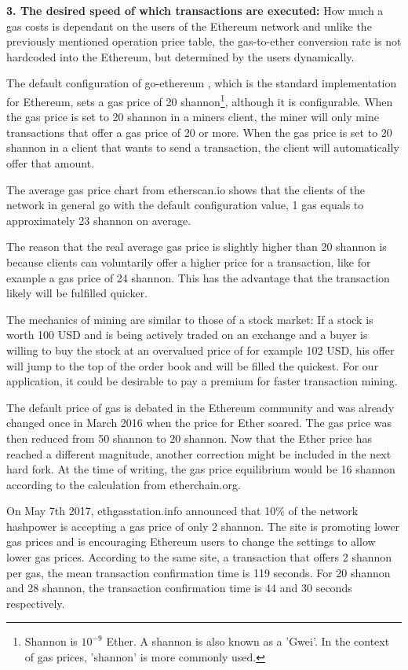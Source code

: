 \par
\textbf{3. The desired speed of which transactions are executed:} How much a gas costs is dependant on the users of the Ethereum network and unlike the previously mentioned operation price table, the gas-to-ether conversion rate is not hardcoded into the Ethereum, but determined by the users dynamically.

The default configuration of go-ethereum \cite{DefaultGoEthereumConfiguration}, which is the standard implementation for Ethereum, sets a gas price of 20 shannon\footnote{ Shannon is $10^{-9}$ Ether. A shannon is also known as a 'Gwei'. In the context of gas prices, 'shannon' is more commonly used.}, although it is configurable. When the gas price is set to 20 shannon in a miners client, the miner will only mine transactions that offer a gas price of 20 or more. When the gas price is set to 20 shannon in a client that wants to send a transaction, the client will automatically offer that amount.

The average gas price chart from etherscan.io shows that the clients of the network in general go with the default configuration value, 1 gas equals to approximately 23 shannon on average.

The reason that the real average gas price is slightly higher than 20 shannon is because clients can voluntarily offer a higher price for a transaction, like for example a gas price of 24 shannon. This has the advantage that the transaction likely will be fulfilled quicker.

The mechanics of mining are similar to those of a stock market: If a stock is worth 100 USD and is being actively traded on an exchange and a buyer is willing to buy the stock at an overvalued price of for example 102 USD, his offer will jump to the top of the order book and will be filled the quickest. For our application, it could be desirable to pay a premium for faster transaction mining.

The default price of gas is debated in the Ethereum community and was already changed once in March 2016 when the price for Ether soared. The gas price was then reduced from 50 shannon to 20 shannon. Now that the Ether price has reached a different magnitude, another correction might be included in the next hard fork. At the time of writing, the gas price equilibrium would be 16 shannon according to the calculation from etherchain.org.

On May 7th 2017, ethgasstation.info announced \cite{ETHGasStationAnnouncement} that 10\% of the network hashpower is accepting a gas price of only 2 shannon. The site is promoting lower gas prices and is encouraging Ethereum users to change the settings to allow lower gas prices. According to the same site, a transaction that offers 2 shannon per gas, the mean transaction confirmation time is 119 seconds. For 20 shannon and 28 shannon, the transaction confirmation time is 44 and 30 seconds respectively.

